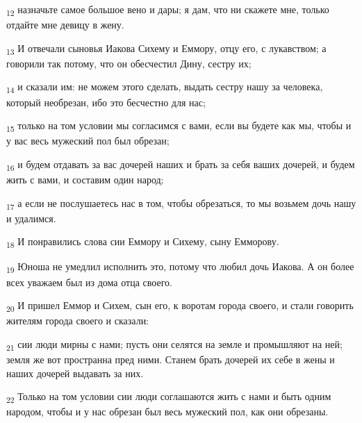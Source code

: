 \begin{tcolorbox}
\textsubscript{12} назначьте самое большое вено и дары; я дам, что ни скажете мне, только отдайте мне девицу в жену.
\end{tcolorbox}
\begin{tcolorbox}
\textsubscript{13} И отвечали сыновья Иакова Сихему и Еммору, отцу его, с лукавством; а говорили так потому, что он обесчестил Дину, сестру их;
\end{tcolorbox}
\begin{tcolorbox}
\textsubscript{14} и сказали им: не можем этого сделать, выдать сестру нашу за человека, который необрезан, ибо это бесчестно для нас;
\end{tcolorbox}
\begin{tcolorbox}
\textsubscript{15} только на том условии мы согласимся с вами, если вы будете как мы, чтобы и у вас весь мужеский пол был обрезан;
\end{tcolorbox}
\begin{tcolorbox}
\textsubscript{16} и будем отдавать за вас дочерей наших и брать за себя ваших дочерей, и будем жить с вами, и составим один народ;
\end{tcolorbox}
\begin{tcolorbox}
\textsubscript{17} а если не послушаетесь нас в том, чтобы обрезаться, то мы возьмем дочь нашу и удалимся.
\end{tcolorbox}
\begin{tcolorbox}
\textsubscript{18} И понравились слова сии Еммору и Сихему, сыну Емморову.
\end{tcolorbox}
\begin{tcolorbox}
\textsubscript{19} Юноша не умедлил исполнить это, потому что любил дочь Иакова. А он более всех уважаем был из дома отца своего.
\end{tcolorbox}
\begin{tcolorbox}
\textsubscript{20} И пришел Еммор и Сихем, сын его, к воротам города своего, и стали говорить жителям города своего и сказали:
\end{tcolorbox}
\begin{tcolorbox}
\textsubscript{21} сии люди мирны с нами; пусть они селятся на земле и промышляют на ней; земля же вот пространна пред ними. Станем брать дочерей их себе в жены и наших дочерей выдавать за них.
\end{tcolorbox}
\begin{tcolorbox}
\textsubscript{22} Только на том условии сии люди соглашаются жить с нами и быть одним народом, чтобы и у нас обрезан был весь мужеский пол, как они обрезаны.
\end{tcolorbox}
